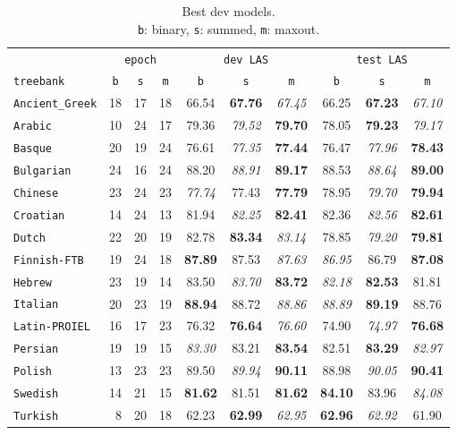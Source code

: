 \documentclass[11pt]{article}
\begin{document}
\begin{table}[htb!]
  \centering
  {\small
    \begin{tabular}{lc@{\enskip}c@{\enskip}cc@{\enskip}c@{\enskip}cc@{\enskip}c@{\enskip}c}
      \toprule
      &\multicolumn{3}{c}{\texttt{epoch}} &\multicolumn{3}{c}{\texttt{dev LAS}} &\multicolumn{3}{c}{\texttt{test LAS}}\\
      \texttt{treebank} &\texttt{b} &\texttt{s} &\texttt{m} &\texttt{b} &\texttt{s} &\texttt{m} &\texttt{b} &\texttt{s} &\texttt{m}\\
      \midrule
      \texttt{Ancient\_Greek} &18 &17 &18 &66.54 &\textbf{67.76} &\textsl{67.45} &66.25 &\textbf{67.23} &\textsl{67.10}\\
      \texttt{Arabic        } &10 &24 &17 &79.36 &\textsl{79.52} &\textbf{79.70} &78.05 &\textbf{79.23} &\textsl{79.17}\\
      \texttt{Basque        } &20 &19 &24 &76.61 &\textsl{77.35} &\textbf{77.44} &76.47 &\textsl{77.96} &\textbf{78.43}\\
      \texttt{Bulgarian     } &24 &16 &24 &88.20 &\textsl{88.91} &\textbf{89.17} &88.53 &\textsl{88.64} &\textbf{89.00}\\
      \texttt{Chinese       } &23 &24 &23 &\textsl{77.74} &77.43 &\textbf{77.79} &78.95 &\textsl{79.70} &\textbf{79.94}\\
      \texttt{Croatian      } &14 &24 &13 &81.94 &\textsl{82.25} &\textbf{82.41} &82.36 &\textsl{82.56} &\textbf{82.61}\\
      \texttt{Dutch         } &22 &20 &19 &82.78 &\textbf{83.34} &\textsl{83.14} &78.85 &\textsl{79.20} &\textbf{79.81}\\
      \texttt{Finnish-FTB   } &19 &24 &18 &\textbf{87.89} &87.53 &\textsl{87.63} &\textsl{86.95} &86.79 &\textbf{87.08}\\
      \texttt{Hebrew        } &23 &19 &14 &83.50 &\textsl{83.70} &\textbf{83.72} &\textsl{82.18} &\textbf{82.53} &81.81\\
      \texttt{Italian       } &20 &23 &19 &\textbf{88.94} &88.72 &\textsl{88.86} &\textsl{88.89} &\textbf{89.19} &88.76\\
      \texttt{Latin-PROIEL  } &16 &17 &23 &76.32 &\textbf{76.64} &\textsl{76.60} &74.90 &\textsl{74.97} &\textbf{76.68}\\
      \texttt{Persian       } &19 &19 &15 &\textsl{83.30} &83.21 &\textbf{83.54} &82.51 &\textbf{83.29} &\textsl{82.97}\\
      \texttt{Polish        } &13 &23 &23 &89.50 &\textsl{89.94} &\textbf{90.11} &88.98 &\textsl{90.05} &\textbf{90.41}\\
      \texttt{Swedish       } &14 &21 &15 &\textbf{81.62} &81.51 &\textbf{81.62} &\textbf{84.10} &83.96 &\textsl{84.08}\\
      \texttt{Turkish       } &~8 &20 &18 &62.23 &\textbf{62.99} &\textsl{62.95} &\textbf{62.96} &\textsl{62.92} &61.90\\
      \bottomrule
    \end{tabular}}
  \caption[]{\label{tab:best}Best dev models.\\
    \texttt{b}: binary, \texttt{s}: summed, \texttt{m}: maxout.}
\end{table}
\end{document}
